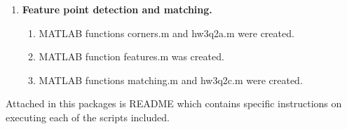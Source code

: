\documentclass[10pt]{article}
\begin{document}
\begin{enumerate}
\item \textbf{Feature point detection and matching.}
\begin{enumerate}
\item MATLAB functions corners.m and hw3q2a.m were created.
\item MATLAB function features.m was created.
\item MATLAB functions matching.m and hw3q2c.m were created.


\end{enumerate}
\end{enumerate}
\vspace{10mm}
Attached in this packages is README which contains specific instructions on executing each of the scripts included.
\end{document}
